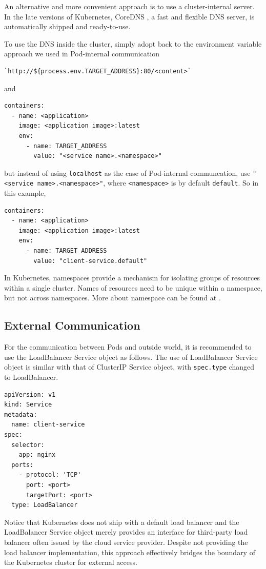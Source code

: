 An alternative and more convenient approach is to use a cluster-internal  server. In the late versions of Kubernetes, CoreDNS \cite{coredns2025corends}, a fast and flexible DNS server, is automatically shipped and ready-to-use.

To use the DNS inside the cluster, simply adopt back to the environment variable approach we used in Pod-internal communication
\begin{lstlisting}
`http://${process.env.TARGET_ADDRESS}:80/<content>`
\end{lstlisting}
and
\begin{lstlisting}
containers:
  - name: <application>
    image: <application image>:latest
    env:
      - name: TARGET_ADDRESS
        value: "<service name>.<namespace>"
\end{lstlisting}
but instead of using \verb|localhost| as the case of Pod-internal communcation, use \texttt{"<service name>.<namespace>"}, where \verb|<namespace>| is by default \verb|default|. So in this example,
\begin{lstlisting}
containers:
  - name: <application>
    image: <application image>:latest
    env:
      - name: TARGET_ADDRESS
        value: "client-service.default"
\end{lstlisting}

In Kubernetes, namespaces provide a mechanism for isolating groups of resources within a single cluster. Names of resources need to be unique within a namespace, but not across namespaces. More about namespace can be found at \cite{kubernetes2024doc}.

\subsection{External Communication}

For the communication between Pods and outside world, it is recommended to use the LoadBalancer Service object as follows. The use of LoadBalancer Service object is similar with that of ClusterIP Service object, with \texttt{spec.type} changed to LoadBalancer.
\begin{lstlisting}
apiVersion: v1
kind: Service
metadata:
  name: client-service
spec:
  selector:
    app: nginx
  ports:
    - protocol: 'TCP'
      port: <port>
      targetPort: <port>
  type: LoadBalancer
\end{lstlisting}

Notice that Kubernetes does not ship with a default load balancer and the LoadBalancer Service object merely provides an interface for third-party load balancer often issued by the cloud service provider. Despite not providing the load balancer implementation, this approach effectively bridges the boundary of the Kubernetes cluster for external access.

